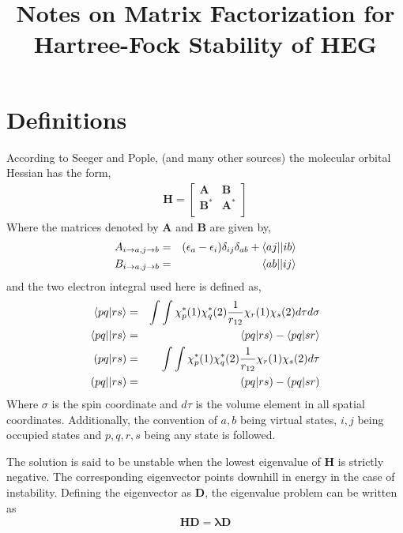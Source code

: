 \documentclass{revtex4}
\newcommand{\e}{\textcolor{myred}{\left(\epsilon_a-\epsilon_i\right)}}
\newcommand{\diag}{\textcolor{myred}{\delta_{ij}\delta_{ab}}}
\begin{document}
\title{Notes on Matrix Factorization for Hartree-Fock Stability of HEG}
\maketitle

\section{Definitions}
According to Seeger and Pople\cite{Seeger1977}, (and many other sources) the molecular orbital
Hessian has the form,
\begin{eqnarray}\label{basic}
\mathbf{H} =
  \begin{bmatrix}
    \mathbf{A}   & \mathbf{B}   \\
    \mathbf{B^*} & \mathbf{A^*} \\
  \end{bmatrix}
\end{eqnarray}
Where the matrices denoted by $\mathbf{A}$ and $\mathbf{B}$ are given by,
\begin{eqnarray}
  A_{i \rightarrow a, j \rightarrow b} &=& \e\diag +  \textcolor{myred}{\braket{aj||ib}} \\
  B_{i \rightarrow a, j \rightarrow b} &=& \textcolor{myblue}{\braket{ab||ij}}         
\end{eqnarray}
and the two electron integral used here is defined as, 
\begin{eqnarray}
  \braket{pq|rs} &=& \int\int \chi^*_p(1) \chi^*_q(2) \frac{1}{r_{12}} \chi_r(1) 
  \chi_s(2)
  d\tau d\sigma \\
  \braket{pq||rs} &=& \braket{pq|rs} - \braket{pq|sr} \\
  (pq|rs) &=& \int\int \chi^*_p(1) \chi^*_q(2) \frac{1}{r_{12}} \chi_r(1) 
  \chi_s(2)
  d\tau \\
  (pq||rs) &=& (pq|rs) - (pq|sr)
\end{eqnarray}
Where $\sigma$ is the spin coordinate and $d\tau$ is the volume element in all spatial coordinates.
Additionally, the convention of $a, b$ being virtual states, $i, j$ being occupied states and 
$p, q, r, s$ being any state is followed.  

The solution is said to be unstable when the lowest eigenvalue of $\mathbf{H}$
is strictly negative. The
corresponding eigenvector points downhill in energy in the case of instability. Defining
the eigenvector as $\mathbf{D}$, the eigenvalue problem can be written as
\begin{eqnarray}
  \mathbf{HD = \lambda D}
\end{eqnarray}
\end{document}
